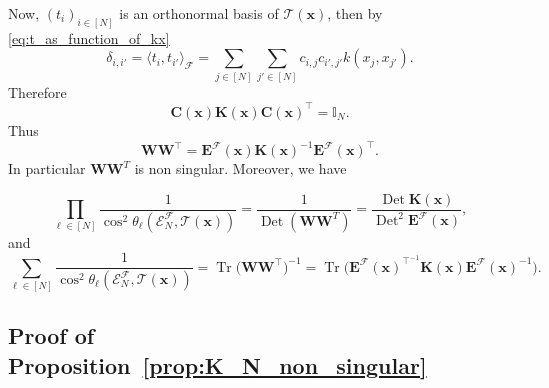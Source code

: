 \documentclass[twoside,11pt]{book}
\numberwithin{theorem}{chapter}
\numberwithin{definition}{chapter}
\numberwithin{proposition}{chapter}
\numberwithin{corollary}{chapter}
\numberwithin{example}{chapter}
\numberwithin{lemma}{chapter}
\numberwithin{assumption}{chapter}
\numberwithin{equation}{chapter}
\numberwithin{figure}{chapter}
\DeclareMathOperator{\Tr}{Tr}
\DeclareMathOperator{\Det}{Det}
\DeclareMathOperator{\Tran}{\intercal}
\begin{document}
%
Now, $(t_{i})_{i \in [N]}$ is an orthonormal basis of $\mathcal{T}(\bm{x})$, then by \eqref{eq:t_as_function_of_kx}
\begin{equation}
  \delta_{i,i'} = \langle t_{i}, t_{i'} \rangle_{\mathcal{F}} = 
 \sum\limits_{j \in [N]} \sum\limits_{j' \in [N]} c_{i,j}c_{i',j'} k(x_{j},x_{j'})   .
\end{equation}
Therefore
\begin{equation}
\bm{C}(\bm{x}) \bm{K}(\bm{x}) \bm{C}(\bm{x})^{\Tran} = \mathbb{I}_{N}.
\end{equation}
Thus 
\begin{equation}
\bm{W}\bm{W}^{\Tran} = \bm{E}^{\mathcal{F}}(\bm{x}) \bm{K}(\bm{x})^{-1} \bm{E}^{\mathcal{F}}(\bm{x})^{\Tran}.
\end{equation}
%
In particular $\bm{W}\bm{W}^{T}$ is non singular. Moreover, we have

\begin{equation}
\prod\limits_{\ell \in [N]} \frac{1}{\cos^{2} \theta_{\ell} \left(\mathcal{E}^{\mathcal{F}}_{N}, \mathcal{T}(\bm{x}) \right)} = \frac{1}{\Det(\bm{W}\bm{W}^{T}) }= \frac{\Det \bm{K}(\bm{x})}{\Det^{2} \bm{E}^{\mathcal{F}}(\bm{x})},
\end{equation}
and
\begin{equation}
\sum\limits_{\ell \in [N]} \frac{1}{\cos^{2} \theta_{\ell} \left(\mathcal{E}^{\mathcal{F}}_{N}, \mathcal{T}(\bm{x}) \right)} = \Tr \big(\bm{W}\bm{W}^{\Tran} \big)^{-1} = \Tr \bigg(\bm{E}^{\mathcal{F}}(\bm{x})^{\Tran^{-1}}  \bm{K}(\bm{x}) \bm{E}^{\mathcal{F}}(\bm{x})^{-1} \bigg).
\end{equation}


\subsection{Proof of Proposition~\ref{prop:K_N_non_singular}}\label{app:K_N_non_singular}
\end{document}
